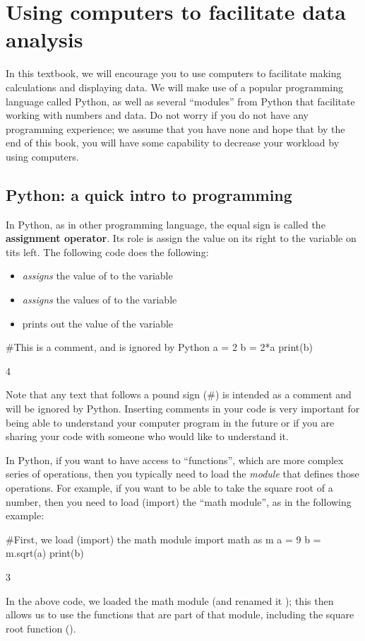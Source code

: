 \section{Using computers to facilitate data analysis}
In this textbook, we will encourage you to use computers to facilitate making calculations and displaying data. We will make use of a popular programming language called Python, as well as several ``modules'' from Python that facilitate working with numbers and data. Do not worry if you do not have any programming experience; we assume that you have none and hope that by the end of this book, you will have some capability to decrease your workload by using computers.

\subsection{Python: a quick intro to programming}
In Python, as in other programming language, the equal sign is called the \textbf{assignment operator}. Its role is assign the value on its right to the variable on tits left. The following code does the following:
\begin{itemize}
\item \textit{assigns} the value of  to the variable 
\item \textit{assigns} the values of  to the variable 
\item prints out the value of the variable 
\end{itemize}

\begin{python}[caption=Declaring variables in Python] 
#This is a comment, and is ignored by Python
a = 2 
b = 2*a
print(b)
\end{python}
\begin{poutput}
4
\end{poutput}
Note that any text that follows a pound sign (\#) is intended as a comment and will be ignored by Python. Inserting comments in your code is very important for being able to understand your computer program in the future or if you are sharing your code with someone who would like to understand it.


In Python, if you want to have access to ``functions'', which are more complex series of operations, then you typically need to load the \textit{module} that defines those operations. For example, if you want to be able to take the square root of a number, then you need to load (import) the ``math module'', as in the following example:
\begin{python}[caption=Using functions from modules] 
#First, we load (import) the math module
import math as m
a = 9
b = m.sqrt(a)
print(b)
\end{python}
\begin{poutput}
3
\end{poutput}
In the above code, we loaded the math module (and renamed it ); this then allows us to use the functions that are part of that module, including the square root function ().

